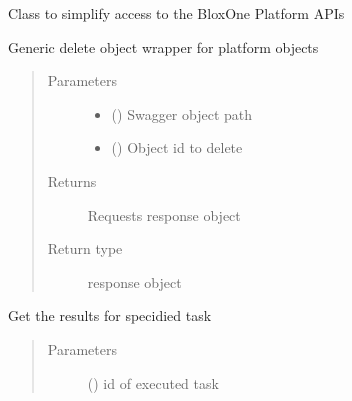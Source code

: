 \documentclass[letterpaper,10pt,english]{sphinxmanual}
\begin{document}
\begin{fulllineitems}
\label{\detokenize{b1diagnostics-class:bloxone.b1diagnostics}}
\sphinxAtStartPar
Class to simplify access to the BloxOne Platform APIs

\begin{fulllineitems}
\label{\detokenize{b1diagnostics-class:bloxone.b1diagnostics.delete}}
\sphinxAtStartPar
Generic delete object wrapper for platform objects
\begin{quote}\begin{description}
\item[{Parameters}] \leavevmode\begin{itemize}
\item {} 
\sphinxAtStartPar
{} () \textendash{} Swagger object path

\item {} 
\sphinxAtStartPar
{} () \textendash{} Object id to delete

\end{itemize}

\item[{Returns}] \leavevmode
\sphinxAtStartPar
Requests response object

\item[{Return type}] \leavevmode
\sphinxAtStartPar
response object

\end{description}\end{quote}

\end{fulllineitems}


\begin{fulllineitems}
\label{\detokenize{b1diagnostics-class:bloxone.b1diagnostics.download_task_results}}
\sphinxAtStartPar
Get the results for specidied task
\begin{quote}\begin{description}
\item[{Parameters}] \leavevmode
\sphinxAtStartPar
{} () \textendash{} id of executed task


\end{description}
\end{quote}
\end{fulllineitems}
\end{fulllineitems}
\end{document}
